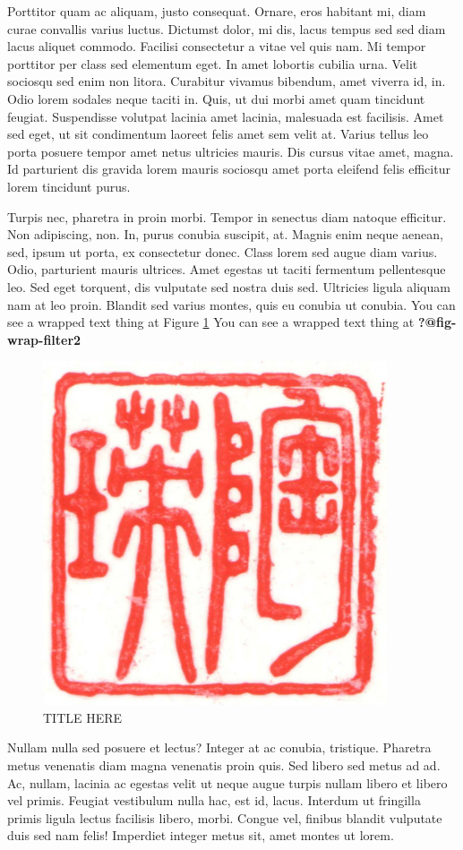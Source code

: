 \documentclass[
  9pt,
  letterpaper,
  DIV=11,
  numbers=noendperiod]{scrartcl}
\begin{document}
Porttitor quam ac aliquam, justo consequat. Ornare, eros habitant mi,
diam curae convallis varius luctus. Dictumst dolor, mi dis, lacus tempus
sed sed diam lacus aliquet commodo. Facilisi consectetur a vitae vel
quis nam. Mi tempor porttitor per class sed elementum eget. In amet
lobortis cubilia urna. Velit sociosqu sed enim non litora. Curabitur
vivamus bibendum, amet viverra id, in. Odio lorem sodales neque taciti
in. Quis, ut dui morbi amet quam tincidunt feugiat. Suspendisse volutpat
lacinia amet lacinia, malesuada est facilisis. Amet sed eget, ut sit
condimentum laoreet felis amet sem velit at. Varius tellus leo porta
posuere tempor amet netus ultricies mauris. Dis cursus vitae amet,
magna. Id parturient dis gravida lorem mauris sociosqu amet porta
eleifend felis efficitur lorem tincidunt purus.

Turpis nec, pharetra in proin morbi. Tempor in senectus diam natoque
efficitur. Non adipiscing, non. In, purus conubia suscipit, at. Magnis
enim neque aenean, sed, ipsum ut porta, ex consectetur donec. Class
lorem sed augue diam varius. Odio, parturient mauris ultrices. Amet
egestas ut taciti fermentum pellentesque leo. Sed eget torquent, dis
vulputate sed nostra duis sed. Ultricies ligula aliquam nam at leo
proin. Blandit sed varius montes, quis eu conubia ut conubia. You can
see a wrapped text thing at Figure \ref{fig-wrap-filter2} You can see a
wrapped text thing at \textbf{?@fig-wrap-filter2}

\begin{figure}
  \centering
  \includegraphics[width=4in,height=0.3\textwidth]{stamp1a.jpg}
  \caption{\label{fig-wrap-filter2}TITLE HERE}
  \vspace{-6pt}
\end{figure}

Nullam nulla sed posuere et lectus? Integer at ac conubia, tristique.
Pharetra metus venenatis diam magna venenatis proin quis. Sed libero sed
metus ad ad. Ac, nullam, lacinia ac egestas velit ut neque augue turpis
nullam libero et libero vel primis. Feugiat vestibulum nulla hac, est
id, lacus. Interdum ut fringilla primis ligula lectus facilisis libero,
morbi. Congue vel, finibus blandit vulputate duis sed nam felis!
Imperdiet integer metus sit, amet montes ut lorem.
\end{document}
